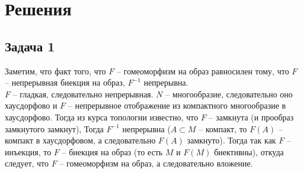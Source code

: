 
\newpage
\section*{Решения}
\subsection*{Задача 1}
	Заметим, что факт того, что $F$ -- гомеоморфизм на образ равносилен тому, что $F$ -- непрерывная биекция на образ, $F^{-1}$ непрерывна.\\
	$F$ -- гладкая, следовательно непрерывная. $N$ -- многообразие, следовательно оно хаусдорфово и $F$ -- непрерывное отображение из компактного многообразие в хаусдорфово. Тогда из курса топологии известно, что $F$ -- замкнута (и прообраз замкнутого замкнут), Тогда $F^{-1}$ непрерывна ($A \subset M$ -- компакт, то $F(A)$ -- компакт в хаусдорфовом, а следовательно $F(A)$ замкнуто). Тогда так как $F$ -- инъекция, то $F$ -- биекция на образ (то есть $M$ и $F(M)$ биективны), откуда следует, что $F$ -- гомеоморфизм на образ, а следовательно вложение.
\vskip0.5in
	
	
